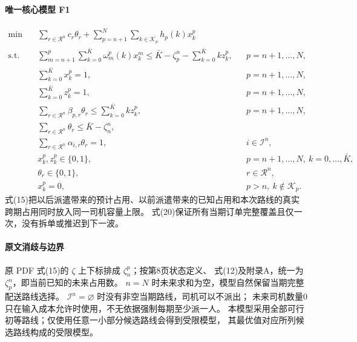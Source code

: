 \documentclass[UTF8,11pt]{ctexart}
\begin{document}
\paragraph{唯一核心模型 F1}
\begin{align}
\min\quad&\sum_{r\in\mathcal R^n}c_r\theta_r+
\sum_{p=n+1}^N\sum_{k\in\mathcal K_p}h_p(k)x_k^p\tag{14}\\
\text{s.t.}\quad&
\sum_{m=n+1}^{p}\sum_{k=0}^{\bar K}\omega_m^p(k)x_k^m
\le\bar K-\zeta_p^n-\sum_{k=0}^{\bar K}kz_k^p,
&&p=n+1,\ldots,N,\tag{15}\\
&\sum_{k=0}^{\bar K}x_k^p=1,
&&p=n+1,\ldots,N,\tag{16}\\
&\sum_{k=0}^{\bar K}z_k^p=1,
&&p=n+1,\ldots,N,\tag{17}\\
&\sum_{r\in\mathcal R^n}\beta_{p,r}\theta_r
\le\sum_{k=0}^{\bar K}kz_k^p,
&&p=n+1,\ldots,N,\tag{18}\\
&\sum_{r\in\mathcal R^n}\theta_r\le\bar K-\zeta_n^n,\tag{19}\\
&\sum_{r\in\mathcal R^n}\alpha_{i,r}\theta_r=1,
&&i\in\mathcal I^n,\tag{20}\\
&x_k^p,z_k^p\in\{0,1\},
&&p=n+1,\ldots,N,\ k=0,\ldots,\bar K,\tag{21}\\
&\theta_r\in\{0,1\},&&r\in\mathcal R^n,\tag{22}\\
&x_k^p=0,&&p>n,\ k\notin\mathcal K_p.\tag{finite}
\end{align}
式(15)把以后派遣带来的预计占用、以前派遣带来的已知占用和本次路线的真实
跨期占用同时放入同一司机容量上限。
式(20)保证所有当期订单完整覆盖且仅一次，没有拆单或推迟到下一波。

\paragraph{原文消歧与边界}
原 PDF 式(15)的 $\zeta$ 上下标排成 $\zeta_n^{p}$；按第8页状态定义、
式(12)及附录A，统一为 $\zeta_p^n$，即当前已知的未来占用数。
$n=N$ 时未来求和为空，模型自然保留当期完整配送路线选择。
$\mathcal I^n=\varnothing$ 时没有非空当期路线，司机可以不派出；
未来司机数量0只在输入成本允许时使用，不无依据强制每期至少派一人。
本模型采用全部可行初等路线；仅使用任意一小部分候选路线会得到受限模型，
其最优值对应所列候选路线构成的受限模型。
\end{document}
